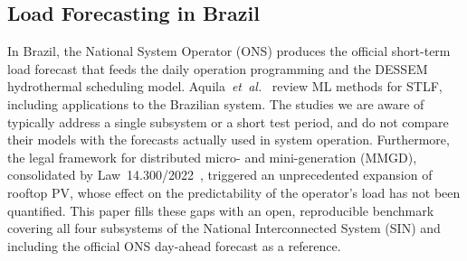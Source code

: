 \subsection{Load Forecasting in Brazil}
In Brazil, the National System Operator (ONS) produces the official short-term load forecast that feeds the daily operation programming and the DESSEM hydrothermal scheduling model. Aquila~\emph{et~al.}~\cite{aquila2023brazil} review ML methods for STLF, including applications to the Brazilian system. The studies we are aware of typically address a single subsystem or a short test period, and do not compare their models with the forecasts actually used in system operation. Furthermore, the legal framework for distributed micro- and mini-generation (MMGD), consolidated by Law~14.300/2022~\cite{lei14300}, triggered an unprecedented expansion of rooftop PV, whose effect on the predictability of the operator's load has not been quantified. This paper fills these gaps with an open, reproducible benchmark covering all four subsystems of the National Interconnected System (SIN) and including the official ONS day-ahead forecast as a reference.
